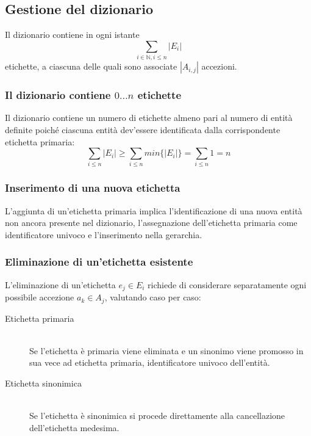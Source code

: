 \documentclass[10pt,a4paper,headinclude,footinclude,hidelinks]{scrreprt} %
\begin{document}
	\subsection{Gestione del dizionario}
	Il dizionario contiene in ogni istante $$\sum_{i \in \mathbb{N}, i \leq n}\left|E_i\right|$$ etichette, a ciascuna delle quali sono associate $\left|A_{i,j}\right|$ accezioni.

	\subsubsection{Il dizionario contiene $0\ldots n$ etichette}
	Il dizionario contiene un numero di etichette almeno pari al numero di entità definite poiché ciascuna entità dev'essere identificata dalla corrispondente etichetta primaria:
	$$\sum_{i \leq n}{\left|E_i\right|} \geq \sum_{i \leq n}{min\{\left|E_i\right|\}} = \sum_{i \leq n}{1} = n$$

	\subsubsection{Inserimento di una nuova etichetta}
	L'aggiunta di un'etichetta primaria implica l'identificazione di una nuova entità non ancora presente nel dizionario, l'assegnazione dell'etichetta primaria come identificatore univoco e l'inserimento nella gerarchia.
	

	\subsubsection{Eliminazione di un'etichetta esistente}
	L'eliminazione di un'etichetta $e_j \in E_i$ richiede di considerare separatamente ogni possibile accezione $a_k \in A_j$, valutando caso per caso:
	\begin{description}
	\item[Etichetta primaria]\hfill \\
	Se l'etichetta è primaria viene eliminata e un sinonimo viene promosso in sua vece ad etichetta primaria, identificatore univoco dell'entità.
 	\item[Etichetta sinonimica] \hfill \\
	Se l'etichetta è sinonimica si procede direttamente alla cancellazione dell'etichetta medesima.
	\end{description}
\end{document}
